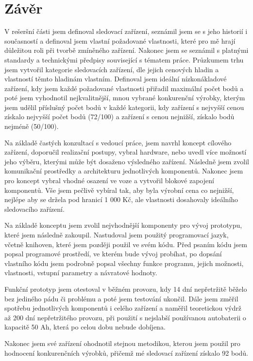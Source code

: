 \documentclass[FM,MP]{tulthesis}  %
\begin{document}

\chapter{Závěr}
V rešeršní části jsem definoval sledovací zařízení, seznámil jsem se s jeho historií i současností a definoval jsem vlastní požadované vlastnosti, které pro mě hrají důležitou roli při tvorbě zmíněného zařízení. Nakonec jsem se seznámil s platnými standardy a technickými předpisy související s tématem práce. Průzkumem trhu jsem vytvořil kategorie sledovacích zařízení, dle jejich cenových hladin a vlastností těmto hladinám vlastním. Definoval jsem ideální nízkonákladové zařízení, kdy jsem každé požadované vlastnosti přiřadil maximální počet bodů a poté jsem vyhodnotil nejkvalitnější, mnou vybrané konkurenční výrobky, kterým jsem udělil příslušný počet bodů v každé kategorii, kdy zařízení s nejvyšší cenou získalo nejvyšší počet bodů (72/100) a zařízení s cenou nejnižší, získalo bodů nejméně (50/100).

Na základě častých konzultací s vedoucí práce, jsem navrhl koncept cílového zařízení, doporučil realizační postupy, vybral hardware, nebo uvedl více možností jeho výběru, kterými může být dosaženo výsledného zařízení. Následně jsem zvolil komunikační prostředky a architekturu jednotlivých komponentů. Nakonec jsem pro koncept vybral vhodné osazení ve voze a vytvořil blokové zapojení komponentů. Vše jsem pečlivě vybíral tak, aby byla výrobní cena co nejnižší, nejlépe aby se držela pod hranicí 1 000 Kč, ale vlastnosti dosahovaly ideálního sledovacího zařízení.

Na základě konceptu jsem zvolil nejvhodnější komponenty pro vývoj prototypu, které jsem následně zakoupil. Nastudoval jsem použitý programovací jazyk, včetně knihoven, které jsem později použil ve svém kódu. Před psaním kódu jsem popsal programové prostředí, ve kterém bude vývoj probíhat, po dopsání vlastního kódu jsem podrobně popsal všechny funkce programu, jejich možnosti, vlastnosti, vstupní parametry a návratové hodnoty. 

Funkční prototyp jsem otestoval v běžném provozu, kdy 14 dní nepřetržitě běželo bez jediného pádu či problému a poté jsem testování ukončil. Dále jsem změřil spotřebu jednotlivých komponentů i celého zařízení a naměřil teoretickou výdrž až 200 dní nepřetržitého provozu, při použití s nejslabší používanou autobaterii o kapacitě 50 Ah, která po celou dobu nebude dobíjena.

Nakonec jsem své zařízení ohodnotil stejnou metodikou, kterou jsem použil pro hodnocení konkurenčních výrobků, přičemž mé sledovací zařízení získalo 92 bodů.
\end{document}
